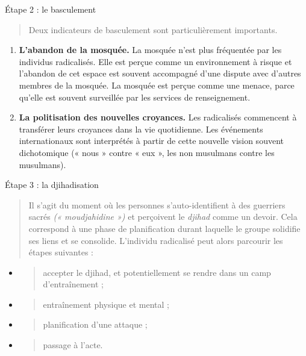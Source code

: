 Étape 2 : le basculement

\begin{quote}
Deux indicateurs de basculement sont particulièrement importants.
\end{quote}

\begin{enumerate}
\def\labelenumi{\arabic{enumi}.}
\item
  \textbf{L'abandon de la mosquée.} La mosquée n'est plus fréquentée par
  les individus radicalisés. Elle est perçue comme un environnement à
  risque et l'abandon de cet espace est souvent accompagné d'une dispute
  avec d'autres membres de la mosquée. La mosquée est perçue comme une
  menace, parce qu'elle est souvent surveillée par les services de
  renseignement.
\item
  \textbf{La politisation des nouvelles croyances.} Les radicalisés
  commencent à transférer leurs croyances dans la vie quotidienne. Les
  événements internationaux sont interprétés à partir de cette nouvelle
  vision souvent dichotomique (« nous » contre « eux », les non
  musulmans contre les musulmans).
\end{enumerate}

\begin{quote}

\end{quote}

Étape 3 : la djihadisation

\begin{quote}
Il s'agit du moment où les personnes s'auto-identifient à des guerriers
sacrés \emph{(« moudjahidine »)} et perçoivent le \emph{djihad} comme un
devoir. Cela correspond à une phase de planification durant laquelle le
groupe solidifie ses liens et se consolide. L'individu radicalisé peut
alors parcourir les étapes suivantes :
\end{quote}

\begin{itemize}
\item
  \begin{quote}
  accepter le djihad, et potentiellement se rendre dans un camp
  d'entraînement ;
  \end{quote}
\item
  \begin{quote}
  entraînement physique et mental ;
  \end{quote}
\item
  \begin{quote}
  planification d'une attaque ;
  \end{quote}
\item
  \begin{quote}
  passage à l'acte.
  \end{quote}
\end{itemize}

